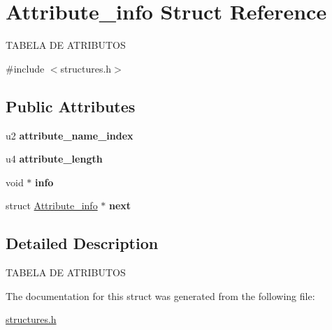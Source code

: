 \hypertarget{structAttribute__info}{}\section{Attribute\+\_\+info Struct Reference}
\label{structAttribute__info}




 T\+A\+B\+E\+LA DE A\+T\+R\+I\+B\+U\+T\+OS  




{\ttfamily \#include $<$structures.\+h$>$}

\subsection*{Public Attributes}
\begin{DoxyCompactItemize}
\item 
\mbox{\label{structAttribute__info_aa4440d705679a387fa1661affcc260fd}} 
u2 {\bfseries attribute\+\_\+name\+\_\+index}
\item 
\mbox{\label{structAttribute__info_a2d181b8a759aef7cdf0dac22a3d44854}} 
u4 {\bfseries attribute\+\_\+length}
\item 
\mbox{\label{structAttribute__info_a73d65210ae5f563f82183f2f611a8c6c}} 
void $\ast$ {\bfseries info}
\item 
\mbox{\label{structAttribute__info_ad9e3931d5a1e1d6d0dc6510c63dc2254}} 
struct \mbox{\hyperlink{structAttribute__info}{Attribute\+\_\+info}} $\ast$ {\bfseries next}
\end{DoxyCompactItemize}


\subsection{Detailed Description}


 T\+A\+B\+E\+LA DE A\+T\+R\+I\+B\+U\+T\+OS 

The documentation for this struct was generated from the following file\+:\begin{DoxyCompactItemize}
\item 
\mbox{\hyperlink{structures_8h}{structures.\+h}}\end{DoxyCompactItemize}
